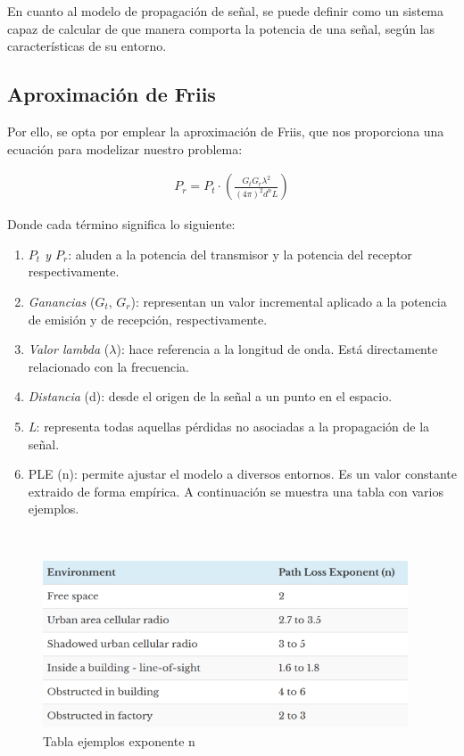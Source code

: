 En cuanto al modelo de propagación de señal, se puede definir como un sistema capaz de calcular de que manera comporta la potencia de una señal, según las características de su entorno.\\

\subsection{Aproximación de Friis}
\label{subsec:friis}

Por ello, se opta por emplear la aproximación de Friis, que nos proporciona una ecuación para  modelizar nuestro problema:

\begin{align}
    P_r = P_t \cdot \left( \frac{G_t G_r \lambda^2 }{(4 \pi)^2 d^n L} \right)
\end{align}

Donde cada término significa lo siguiente:

\begin{enumerate}
    \item \emph{$P_t$ y $P_r$}: aluden a la potencia del transmisor y la potencia del receptor respectivamente.

    \item \emph{Ganancias} ($G_t$, $G_r$): representan un valor incremental aplicado a la potencia de emisión y de recepción, respectivamente.

    \item \emph{Valor lambda} ($\lambda$): hace referencia a la longitud de onda. Está directamente relacionado con la frecuencia.

    \item \emph{Distancia} (d): desde el origen de la señal a un punto en el espacio.

    \item \emph{L}: representa todas aquellas pérdidas no asociadas a la propagación de la señal.

    \item \ac{PLE} (n): permite ajustar el modelo a diversos entornos. Es un valor constante extraido de forma empírica. A continuación se muestra una tabla con varios ejemplos.
\end{enumerate} \cite{friis-1}\\

\begin{figure} [H]
	\begin{center}
	\includegraphics[height=5cm]{imagenes/cap4/4_PLE_table.png}
	\end{center}
	\caption[Tabla ejemplos exponente n]{Tabla ejemplos exponente n}
	\label{fig:ple_table}
\end{figure}

